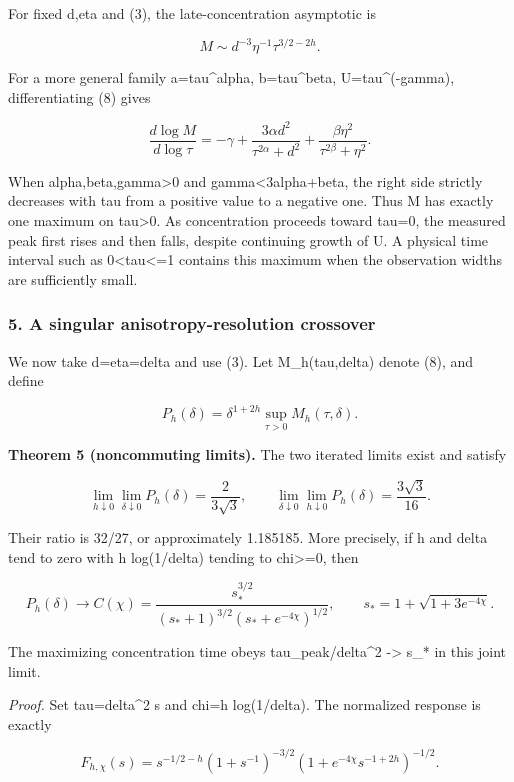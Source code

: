 \documentclass[
]{article}
\begin{document}
For fixed d,eta and (3), the late-concentration asymptotic is

\[
M\sim d^{-3}\eta^{-1}\tau^{3/2-2h}. \tag{9}
\]

For a more general family a=tau\^{}alpha, b=tau\^{}beta,
U=tau\^{}(-gamma), differentiating (8) gives

\[
\frac{d\log M}{d\log\tau}=-\gamma+
\frac{3\alpha d^2}{\tau^{2\alpha}+d^2}+
\frac{\beta\eta^2}{\tau^{2\beta}+\eta^2}. \tag{10}
\]

When alpha,beta,gamma\textgreater0 and gamma\textless3alpha+beta, the
right side strictly decreases with tau from a positive value to a
negative one. Thus M has exactly one maximum on tau\textgreater0. As
concentration proceeds toward tau=0, the measured peak first rises and
then falls, despite continuing growth of U. A physical time interval
such as 0\textless tau\textless=1 contains this maximum when the
observation widths are sufficiently small.

\hypertarget{a-singular-anisotropy-resolution-crossover}{%
\subsubsection{5. A singular anisotropy-resolution
crossover}\label{a-singular-anisotropy-resolution-crossover}}

We now take d=eta=delta and use (3). Let M\_h(tau,delta) denote (8), and
define

\[
P_h(\delta)=\delta^{1+2h}\sup_{\tau>0}M_h(\tau,\delta). \tag{11}
\]

\textbf{Theorem 5 (noncommuting limits).} The two iterated limits exist
and satisfy

\[
\lim_{h\downarrow0}\lim_{\delta\downarrow0}P_h(\delta)
=\frac{2}{3\sqrt3},\qquad
\lim_{\delta\downarrow0}\lim_{h\downarrow0}P_h(\delta)
=\frac{3\sqrt3}{16}. \tag{12}
\]

Their ratio is 32/27, or approximately 1.185185. More precisely, if h
and delta tend to zero with h log(1/delta) tending to chi\textgreater=0,
then

\[
P_h(\delta)\longrightarrow C(\chi)
=\frac{s_*^{3/2}}{(s_*+1)^{3/2}(s_*+e^{-4\chi})^{1/2}},
\qquad s_*=1+\sqrt{1+3e^{-4\chi}}. \tag{13}
\]

The maximizing concentration time obeys tau\_peak/delta\^{}2
-\textgreater{} s\_* in this joint limit.

\emph{Proof.} Set tau=delta\^{}2 s and chi=h log(1/delta). The
normalized response is exactly

\[
F_{h,\chi}(s)=s^{-1/2-h}(1+s^{-1})^{-3/2}
(1+e^{-4\chi}s^{-1+2h})^{-1/2}. \tag{14}
\]
\end{document}
